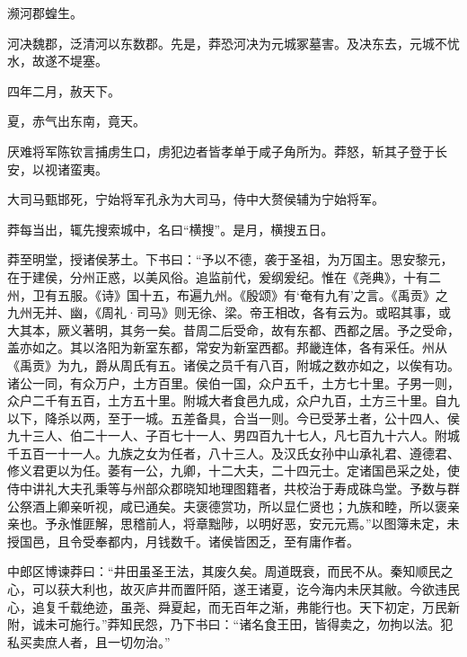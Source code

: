 \documentclass[12pt,UTF8]{ctexbook}
\begin{document}
濒河郡蝗生。



河决魏郡，泛清河以东数郡。先是，莽恐河决为元城冢墓害。及决东去，元城不忧水，故遂不堤塞。



四年二月，赦天下。



夏，赤气出东南，竟天。



厌难将军陈钦言捕虏生口，虏犯边者皆孝单于咸子角所为。莽怒，斩其子登于长安，以视诸蛮夷。



大司马甄邯死，宁始将军孔永为大司马，侍中大赘侯辅为宁始将军。



莽每当出，辄先搜索城中，名曰“横搜”。是月，横搜五日。



莽至明堂，授诸侯茅土。下书曰：“予以不德，袭于圣祖，为万国主。思安黎元，在于建侯，分州正惑，以美风俗。追监前代，爰纲爰纪。惟在《尧典》，十有二州，卫有五服。《诗》国十五，布遍九州。《殷颂》有‘奄有九有’之言。《禹贡》之九州无并、幽，《周礼·司马》则无徐、梁。帝王相改，各有云为。或昭其事，或大其本，厥义著明，其务一矣。昔周二后受命，故有东都、西都之居。予之受命，盖亦如之。其以洛阳为新室东都，常安为新室西都。邦畿连体，各有采任。州从《禹贡》为九，爵从周氏有五。诸侯之员千有八百，附城之数亦如之，以俟有功。诸公一同，有众万户，土方百里。侯伯一国，众户五千，土方七十里。子男一则，众户二千有五百，土方五十里。附城大者食邑九成，众户九百，土方三十里。自九以下，降杀以两，至于一城。五差备具，合当一则。今已受茅土者，公十四人、侯九十三人、伯二十一人、子百七十一人、男四百九十七人，凡七百九十六人。附城千五百一十一人。九族之女为任者，八十三人。及汉氏女孙中山承礼君、遵德君、修义君更以为任。萎有一公，九卿，十二大夫，二十四元士。定诸国邑采之处，使侍中讲礼大夫孔秉等与州部众郡晓知地理图籍者，共校治于寿成硃鸟堂。予数与群公祭酒上卿亲听视，咸已通矣。夫褒德赏功，所以显仁贤也；九族和睦，所以褒亲亲也。予永惟匪解，思稽前人，将章黜陟，以明好恶，安元元焉。”以图簿未定，未授国邑，且令受奉都内，月钱数千。诸侯皆困乏，至有庸作者。



中郎区博谏莽曰：“井田虽圣王法，其废久矣。周道既衰，而民不从。秦知顺民之心，可以获大利也，故灭庐井而置阡陌，遂王诸夏，讫今海内未厌其敝。今欲违民心，追复千载绝迹，虽尧、舜夏起，而无百年之渐，弗能行也。天下初定，万民新附，诚未可施行。”莽知民怨，乃下书曰：“诸名食王田，皆得卖之，勿拘以法。犯私买卖庶人者，且一切勿治。”
\end{document}
